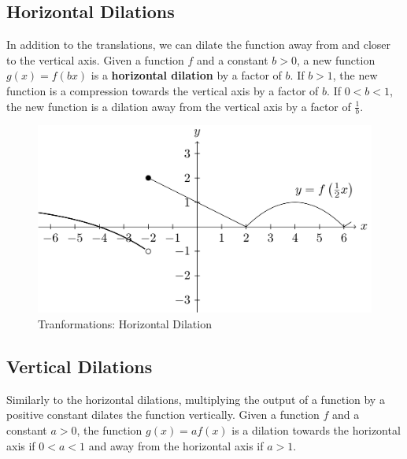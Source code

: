 \documentclass[
]{book}
\theoremstyle{definition}
\theoremstyle{definition}
\theoremstyle{definition}
\theoremstyle{definition}
\theoremstyle{remark}
\begin{document}
\hypertarget{horizontal-dilations}{%
\subsection{Horizontal Dilations}\label{horizontal-dilations}}

In addition to the translations, we can dilate the function away from and closer to the vertical axis. Given a function \(f\) and a constant \(b>0\), a new function \(g(x)=f(bx)\) is a \textbf{horizontal dilation} by a factor of \(b\). If \(b>1\), the new function is a compression towards the vertical axis by a factor of \(b\). If \(0<b<1\), the new function is a dilation away from the vertical axis by a factor of \(\frac{1}{b}\).

\begin{figure}

{\centering \includegraphics[width=0.8\linewidth]{tikz/horizontal-dilation} 

}

\caption{Tranformations: Horizontal Dilation}\label{fig:horizontal-dilation}
\end{figure}

\hypertarget{vertical-dilations}{%
\subsection{Vertical Dilations}\label{vertical-dilations}}

Similarly to the horizontal dilations, multiplying the output of a function by a positive constant dilates the function vertically. Given a function \(f\) and a constant \(a>0\), the function \(g(x)=a f(x)\) is a dilation towards the horizontal axis if \(0<a<1\) and away from the horizontal axis if \(a>1\).
\end{document}
